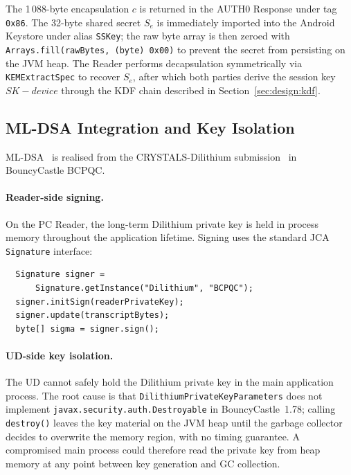 \documentclass[runningheads]{llncs}
\begin{document}
\noindent
The 1\,088-byte encapsulation $c$ is returned in the AUTH0 Response under
tag \texttt{0x86}.
The 32-byte shared secret $S_e$ is immediately imported into the Android
Keystore under alias \texttt{SSKey}; the raw byte array is then zeroed with
\texttt{Arrays.\allowbreak fill(raw\-Bytes,\allowbreak\ (byte)\allowbreak\ 0x00)} to prevent the secret from
persisting on the JVM heap.
The Reader performs decapsulation symmetrically via \texttt{KEMExtractSpec}
to recover $S_e$, after which both parties derive the session key
$\mathit{SK-device}$ through the KDF chain described in
Section~\ref{sec:design:kdf}.

\subsection{ML-DSA Integration and Key Isolation}
\label{sec:impl:isolation}

ML-DSA~\cite{NIST:FIPS204} is realised from the CRYSTALS-Dilithium
submission~\cite{TCHES:DKLLSSS18} in BouncyCastle BCPQC.

\paragraph{Reader-side signing.}
On the PC Reader, the long-term Dilithium private key is held in process
memory throughout the application lifetime.
Signing uses the standard JCA \texttt{Signature} interface:
\begin{verbatim}
  Signature signer =
      Signature.getInstance("Dilithium", "BCPQC");
  signer.initSign(readerPrivateKey);
  signer.update(transcriptBytes);
  byte[] sigma = signer.sign();
\end{verbatim}

\paragraph{UD-side key isolation.}
The UD cannot safely hold the Dilithium private key in the main application
process.
The root cause is that \texttt{Dilithium\allowbreak PrivateKey\allowbreak Parameters} does not
implement \texttt{javax.\allowbreak security.\allowbreak auth.\allowbreak Destroyable} in BouncyCastle~1.78;
calling \texttt{destroy()} leaves the key material on the JVM heap until the
garbage collector decides to overwrite the memory region, with no timing
guarantee.
A compromised main process could therefore read the private key from heap
memory at any point between key generation and GC collection.
\end{document}
